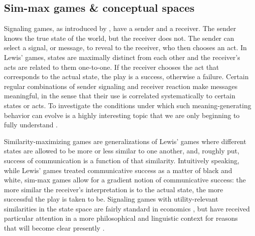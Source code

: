 \subsection{Sim-max games \& conceptual spaces}

Signaling games, as introduced by \citet{Lewis_1969:Convention}, have
a sender and a receiver. The sender knows the true state of the world,
but the receiver does not. The sender can select a signal, or message,
to reveal to the receiver, who then chooses an act. In Lewis' games,
states are maximally distinct from each other and the receiver's acts
are related to them one-to-one. If the receiver chooses the act that
corresponds to the actual state, the play is a success, otherwise a
failure. Certain regular combinations of sender signaling and receiver
reaction make messages meaningful, in the sense that their use is
correlated systematically to certain states or acts. To investigate
the conditions under which such meaning-generating behavior can evolve
is a highly interesting topic that we are only beginning to fully
understand
\citep[e.g.][]{Warneryd1993:Cheap-Talk-Coor,BlumeKim1993:Evolutionary-St,Zollman2005:Talking-to-Neig,Huttegger2007:Evolution-and-t,Pawlowitsch2008:Why-Evolution-d,Barrett2009:The-Evolution-o,Wagner2009:Communication-a,HutteggerSkyrms2010:Evolutionary-Dy,Skyrms2010:Signals,HutteggerZollman2011:Signaling-Games}.

Similarity-maximizing games are generalizations of Lewis' games where
different states are allowed to be more or less similar to one
another, and, roughly put, success of communication is a function of
that similarity. Intuitively speaking, while Lewis' games treated
communicative success as a matter of black and white, sim-max games
allow for a gradient notion of communicative success: the more similar
the receiver's interpretation is to the actual state, the more
successful the play is taken to be. Signaling games with
utility-relevant similarities in the state space are fairly standard
in economics
\citep[e.g.][]{Spence1973:Job-market-sign,CrawfordSobel1982:Strategic-Infor},
but have received particular attention in a more philosophical and
linguistic context for reasons that will become clear presently
\citep{Jager2007:The-Evolution-o,JagerRooijvan-Rooij2007:Language-Struct,JagerMetzger2011:Voronoi-Languag}.


